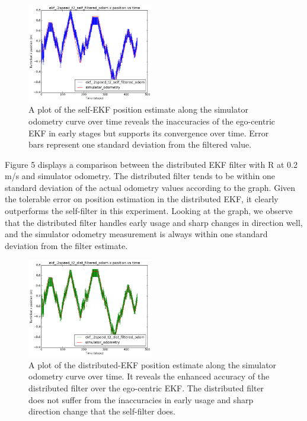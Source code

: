 \documentclass[conference]{IEEEtran} \usepackage[T1]{fontenc} \usepackage[backend=biber, style=ieee]{biblatex}
\begin{document}
\begin{figure}

\centering 
\includegraphics[width=0.49\textwidth]{ekf_2speed_t2_self_filtered_odom_pos_err_graph}
\caption {A plot of the self-EKF position estimate along the simulator odometry curve over time 
reveals the inaccuracies of the ego-centric EKF in early stages but supports its convergence over time.
Error bars represent one standard deviation from the filtered value.}
\label{pic4} 
\end{figure}

\par
Figure 5 displays a comparison between the distributed EKF filter with R at 0.2 m/s and simulator odometry. The 
distributed filter tends to be within one standard deviation of the actual odometry values according to the graph. 
Given the tolerable error on position estimation in the distributed EKF, it clearly outperforms the self-filter 
in this experiment. Looking at the graph, we observe that the distributed filter handles early usage and sharp changes in direction well, 
and the simulator odometry measurement is always within one standard deviation from the filter estimate.

\begin{figure}
\centering 
\includegraphics[width=0.49\textwidth]{ekf_2speed_t2_dist_filtered_odom_pos_err_graph}
\caption {A plot of the distributed-EKF position estimate along the simulator odometry curve over time. It 
reveals the enhanced accuracy of the distributed filter over the ego-centric EKF. The distributed filter does not suffer 
from the inaccuracies in early usage and sharp direction change that the self-filter does.}
\label{pic5}
\end{figure}
\end{document}
